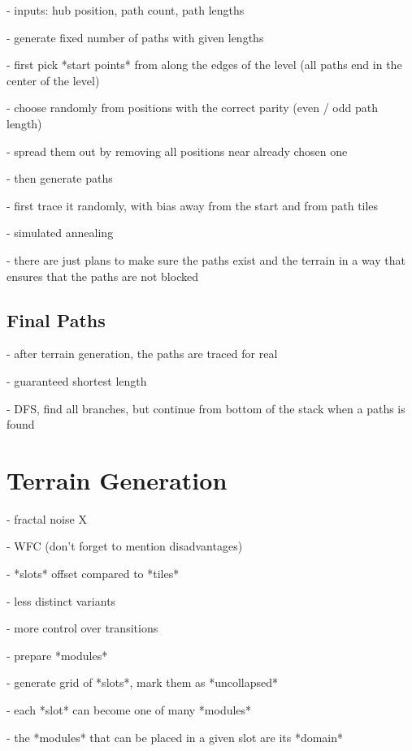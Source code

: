 - inputs: hub position, path count, path lengths

- generate fixed number of paths with given lengths

- first pick *start points* from along the edges of the level (all paths end in the center of the level)

- choose randomly from positions with the correct parity (even / odd path length)

- spread them out by removing all positions near already chosen one

- then generate paths

- first trace it randomly, with bias away from the start and from path tiles

- simulated annealing

- there are just plans to make sure the paths exist and the terrain in a way that ensures that the paths are not blocked

\subsection{Final Paths}

- after terrain generation, the paths are traced for real

- guaranteed shortest length

- DFS, find all branches, but continue from bottom of the stack when a paths is found

\section{Terrain Generation}

- fractal noise X

- WFC \checkmark (don't forget to mention disadvantages)



- *slots* offset compared to *tiles*

- less distinct variants

- more control over transitions

- prepare *modules*

- generate grid of *slots*, mark them as *uncollapsed*

- each *slot* can become one of many *modules*

- the *modules* that can be placed in a given slot are its *domain*

